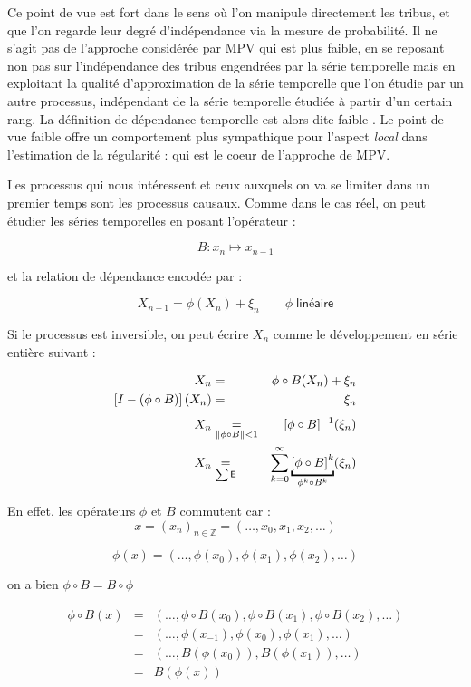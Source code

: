 Ce point de vue est \og fort \fg dans le sens où l'on manipule directement les tribus, et que l'on regarde leur degré d'indépendance via la mesure de probabilité. Il ne s'agit pas de l'approche considérée par MPV qui est plus faible, en se reposant non pas sur l'indépendance des tribus engendrées par la série temporelle mais en exploitant la qualité d'approximation de la série temporelle que l'on étudie par un autre processus, indépendant de la série temporelle étudiée à partir d'un certain rang. La définition de dépendance temporelle est alors dite \og faible \fg. Le point de vue faible offre un comportement plus sympathique pour l'aspect \emph{local} dans l'estimation de la régularité : qui est le coeur de l'approche de MPV.
    
\bigskip 

Les processus qui nous intéressent et ceux auxquels on va se limiter dans un premier temps sont les processus causaux. Comme dans le cas réel, on peut étudier les séries temporelles en posant l'opérateur :

$$B : x_n \mapsto x_{n-1}$$

et la relation de dépendance encodée par :

$$X_{n-1} = \phi(X_n) + \xi_n \qquad \phi \; \textsf{linéaire}$$

Si le processus est inversible, on peut écrire $X_n$ comme le développement en série entière suivant :

\begin{align*}
    X_n &=& \phi \circ B(X_n) + \xi_n\\
    \left[I - (\phi \circ B)\right](X_n) &\underset{\textsf{}} =& \xi_n 
    \\
    X_n&\underset{\Vert \phi \circ B \Vert < 1} =& \inverse{[\phi \circ B]} (\xi_n)
    \\
    X_n &\underset{\sum \textsf{E}} =& \sum\limits_{k=0}^\infty \underbracket{\left[ \phi \circ B \right]^k}_{\phi^k \circ B^k}(\xi_n)
\end{align*}


En effet, les opérateurs $\phi$ et $B$ commutent car : 
$$x = (x_n)_{n \in \mathds Z} = (\dots , x_0, x_1, x_2, \dots)$$

$$\phi(x) = (\dots , \phi(x_0), \phi(x_1), \phi(x_2), \dots)$$

on a bien $\phi \circ B = B \circ \phi$

\begin{align*}
    \phi \circ B(x) &=& (\dots , \phi \circ B(x_0), \phi \circ B(x_1), \phi \circ B(x_2), \dots) 
    \\
    &=& (\dots, \phi(x_{-1}), \phi(x_0), \phi(x_1), \dots)
    \\
    &=& (\dots, B\left(\phi(x_0)\right) , B(\phi(x_1)),\dots)
    \\
    &=& B\left( \phi(x) \right)
\end{align*}


